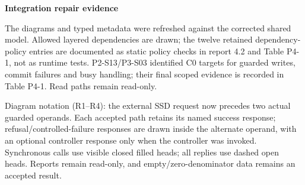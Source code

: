 \textbf{Integration repair evidence}

The diagrams and typed metadata were refreshed against the corrected shared model. Allowed layered dependencies are drawn; the twelve retained dependency-policy entries are documented as static policy checks in report 4.2 and Table P4-1, not as runtime tests. P2-S13/P3-S03 identified C0 targets for guarded writes, commit failures and busy handling; their final scoped evidence is recorded in Table P4-1. Read paths remain read-only.

Diagram notation (R1--R4): the external SSD request now precedes two actual guarded operands. Each accepted path retains its named success response; refusal/controlled-failure responses are drawn inside the alternate operand, with an optional controller response only when the controller was invoked. Synchronous calls use visible closed filled heads; all replies use dashed open heads. Reports remain read-only, and empty/zero-denominator data remains an accepted result.
